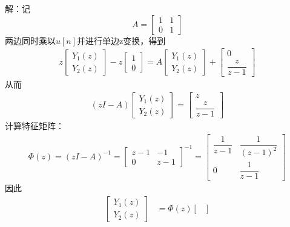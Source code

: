 \begin{example}
    解：记
    $$A=\begin{bmatrix}
            1 & 1\\
            0 & 1
        \end{bmatrix}$$
    两边同时乘以$u[n]$并进行单边z变换，得到\begin{align*}
        z\begin{bmatrix}
            Y_1(z) \\
            Y_2(z)
        \end{bmatrix} - z\begin{bmatrix}
            1\\
            0
        \end{bmatrix} = A\begin{bmatrix}
            Y_1(z)\\
            Y_2(z)
        \end{bmatrix} + \begin{bmatrix}
            0\\
            \dfrac{z}{z-1}
        \end{bmatrix}
    \end{align*}
    从而\begin{align*}
        (zI - A) \begin{bmatrix}
            Y_1(z)\\
            Y_2(z)
        \end{bmatrix} = \begin{bmatrix}
            z\\
            \dfrac{z}{z-1}
        \end{bmatrix}
    \end{align*}
    计算特征矩阵：\begin{align*}
        \Phi(z)=(zI - A)^{-1} =\begin{bmatrix}
            z-1 & -1\\
            0 & z-1
        \end{bmatrix}^{-1}= \begin{bmatrix}
            \dfrac{1}{z-1} & \dfrac{1}{(z-1)^2}\\
            0 & \dfrac{1}{z-1}
        \end{bmatrix}
    \end{align*}
    因此\begin{align*}
        \begin{bmatrix}
            Y_1(z)\\
            Y_2(z)
        \end{bmatrix} & = \Phi(z) \begin{bmatrix}

\end{bmatrix}
\end{align*}
\end{example}
